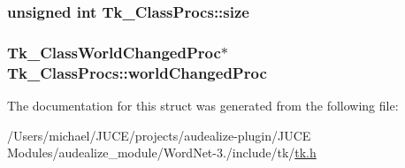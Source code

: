 \subsubsection[{\texorpdfstring{size}{size}}]{\setlength{\rightskip}{0pt plus 5cm}unsigned {\bf int} Tk\+\_\+\+Class\+Procs\+::size}\hypertarget{struct_tk___class_procs_ae3c696f19a9b4f801c0bea57e231be25}{}\label{struct_tk___class_procs_ae3c696f19a9b4f801c0bea57e231be25}
\subsubsection[{\texorpdfstring{world\+Changed\+Proc}{worldChangedProc}}]{\setlength{\rightskip}{0pt plus 5cm}Tk\+\_\+\+Class\+World\+Changed\+Proc$\ast$ Tk\+\_\+\+Class\+Procs\+::world\+Changed\+Proc}\hypertarget{struct_tk___class_procs_add8fc1b8ee534ecdb794e688d1b8fb89}{}\label{struct_tk___class_procs_add8fc1b8ee534ecdb794e688d1b8fb89}


The documentation for this struct was generated from the following file\+:\begin{DoxyCompactItemize}
\item 
/\+Users/michael/\+J\+U\+C\+E/projects/audealize-\/plugin/\+J\+U\+C\+E Modules/audealize\+\_\+module/\+Word\+Net-\/3./include/tk/\hyperlink{tk_8h}{tk.\+h}\end{DoxyCompactItemize}
